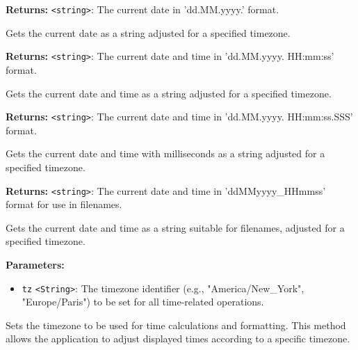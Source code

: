 \documentclass[12pt,a4paper]{article}
\begin{document}
\noindent \textbf{Returns:} \texttt{<string>}: The current date in 'dd.MM.yyyy.' format.

\noindent Gets the current date as a string adjusted for a specified timezone.

\vspace{5mm}
\noindent {}


\noindent \textbf{Returns:} \texttt{<string>}: The current date and time in 'dd.MM.yyyy. HH:mm:ss' format.

\noindent Gets the current date and time as a string adjusted for a specified timezone.

\vspace{5mm}
\noindent {}


\noindent \textbf{Returns:} \texttt{<string>}: The current date and time in 'dd.MM.yyyy. HH:mm:ss.SSS' format.

\noindent Gets the current date and time with milliseconds as a string adjusted for a specified timezone.

\vspace{5mm}
\noindent {}


\noindent \textbf{Returns:} \texttt{<string>}: The current date and time in 'ddMMyyyy\_HHmmss' format for use in filenames.

\noindent Gets the current date and time as a string suitable for filenames, adjusted for a specified timezone.

\vspace{5mm}
\noindent {}


\noindent \textbf{Parameters:}
\begin{itemize}
  \item \texttt{tz} \texttt{<String>}: The timezone identifier (e.g., "America/New\_York", "Europe/Paris") to be set for all time-related operations.
\end{itemize}

\noindent Sets the timezone to be used for time calculations and formatting. This method allows the application to adjust displayed times according to a specific timezone.
\end{document}

